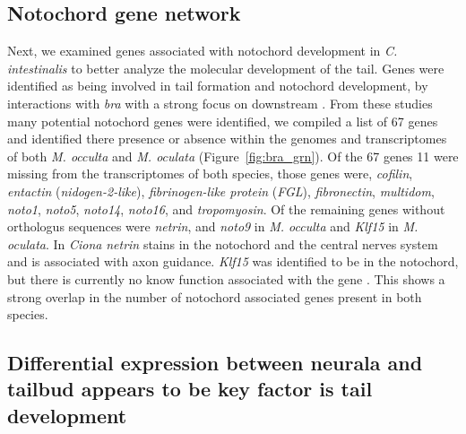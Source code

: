 \subsection{Notochord gene network}

Next, we examined genes associated with notochord development in \textit{C. intestinalis} to better analyze the molecular development of the tail. Genes were identified as being involved in tail formation and notochord development, by interactions with \textit{bra} with a strong focus on downstream \cite{hotta_temporal_1999,hotta_characterization_2000,hotta_brachyury-downstream_2007,kugler_evolutionary_2008,kugler_evolutionary_2011}. From these studies many potential notochord genes were identified, we compiled a list of 67 genes and identified there presence or absence within the genomes and transcriptomes of both \textit{M. occulta} and \textit{M. oculata} (Figure~\ref{fig:bra_grn}). Of the 67 genes 11 were missing from the transcriptomes of both species, those genes were, \textit{cofilin}, \textit{entactin} (\textit{nidogen-2-like}), \textit{fibrinogen-like protein} (\textit{FGL}), \textit{fibronectin}, \textit{multidom}, \textit{noto1}, \textit{noto5}, \textit{noto14}, \textit{noto16}, and \textit{tropomyosin}. Of the remaining genes without orthologus sequences were \textit{netrin}, and \textit{noto9} in \textit{M. occulta} and \textit{Klf15} in \textit{M. oculata}. In \textit{Ciona} \textit{netrin} stains in the notochord and the central nerves system and is associated with axon guidance\cite{hotta_characterization_2000}. \textit{Klf15} was identified to be in the notochord, but there is currently no know function associated with the gene \cite{passamaneck_direct_2009}. This shows a strong overlap in the number of notochord associated genes present in both species.

\subsection{Differential expression between neurala and tailbud appears to be key factor is tail development} 

